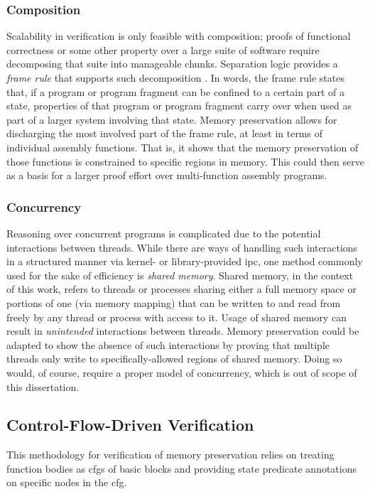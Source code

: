 \subsubsection{Composition}\label{sse:composition}
Scalability in verification is only feasible with composition;
proofs of functional correctness or some other property over a large suite of software
require decomposing that suite into manageable chunks.
Separation logic provides a \emph{frame rule} that supports such%
decomposition \autocite{o2001local,reynolds2002separation,krebbers2017essence}.
In words, the frame rule states that,
if a program or program fragment can be confined to a certain part of a state,
properties of that program or program fragment carry over
when used as part of a larger system involving that state.
Memory preservation allows for discharging the most involved part of the frame rule,
at least in terms of individual assembly functions.
That is, it shows that the memory preservation of those functions is constrained
to specific regions in memory.
This could then serve as a basis
for a larger proof effort over multi-function assembly programs.

\subsubsection{Concurrency}
Reasoning over concurrent programs is complicated
due to the potential interactions between threads.
While there are ways of handling such interactions in a structured manner
via kernel- or library-provided \ac{ipc},
one method commonly used for the sake of efficiency is \emph{shared memory}.
Shared memory, in the context of this work,
refers to threads or processes sharing either a full memory space
or portions of one (via memory mapping)
that can be written to and read from freely by any thread or process with access to it.
Usage of shared memory can result in \emph{unintended} interactions between threads.
Memory preservation could be adapted to show the absence of such interactions
by proving that multiple threads only write
to specifically-allowed regions of shared memory.
Doing so would, of course, require a proper model of concurrency,
which is out of scope of this dissertation.

\subsection{Control-Flow-Driven Verification}
This methodology for verification of memory preservation relies on treating function bodies
as \acp{cfg} of basic blocks
and providing state predicate annotations on specific nodes in the \ac{cfg}.


